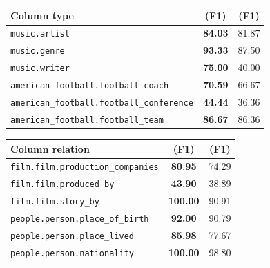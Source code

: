 \begin{table}[t]
\caption{Further analysis on column type prediction (left) and on column relation prediction (right.)}\label{tab:tur_class_f1}
\begin{subfigure}[b]{0.49\textwidth}
    \centering
    \small
    \begin{tabular}{p{5.1cm}|c|c}\hline
    Column type & \name{} (F1) & \namest{} (F1) \\\hline\hline
    {\tt music.artist}                          &   {\bf 84.03}  &   81.87 \\
    {\tt music.genre}                           &   {\bf 93.33}  &   87.50 \\
    {\tt music.writer}                          &   {\bf 75.00}  &   40.00 \\ 
    {\tt american\_football.football\_coach}      &  {\bf 70.59}  &   66.67 \\
    {\tt american\_football.football\_conference} &  {\bf 44.44}  &   36.36 \\
    {\tt american\_football.football\_team}       &  {\bf 86.67}  &   86.36 \\\hline
    \end{tabular}
\end{subfigure}
\begin{subfigure}[b]{0.49\textwidth}
    \centering
    \small
    \begin{tabular}{p{4.1cm}|c|c}\hline
    Column relation & \name{} (F1) & \namest{} (F1) \\\hline\hline
    {\tt film.film.production\_companies}                          & {\bf 80.95}  & 74.29 \\
    {\tt film.film.produced\_by}                                   & {\bf 43.90}  & 38.89	\\
    {\tt film.film.story\_by}                                      & {\bf 100.00} & 90.91	\\
    {\tt people.person.place\_of\_birth}                           & {\bf 92.00}  & 90.79	\\
    {\tt people.person.place\_lived} & {\bf 85.98}  & 77.67	 \\
    {\tt people.person.nationality}                                & {\bf 100.00} & 98.80 \\\hline
    \end{tabular}
\end{subfigure}
\end{table}


